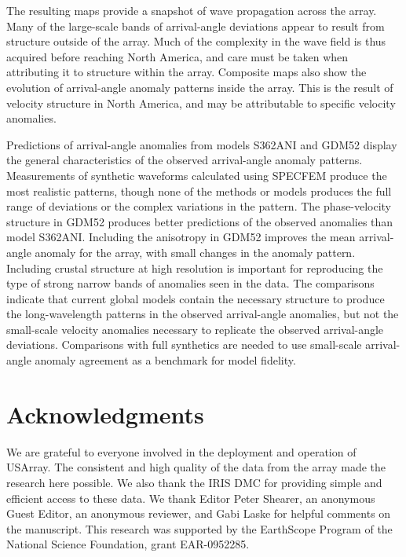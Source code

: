 \documentclass[12pt,oneside]{book}
\begin{document}
The resulting maps provide a snapshot of wave propagation across the array. Many of the large-scale bands of arrival-angle deviations appear to result from structure outside of the array. Much of the complexity in the wave field is thus acquired before reaching North America, and care must be taken when attributing it to structure within the array. Composite maps also show the evolution of arrival-angle anomaly patterns inside the array. This is the result of velocity structure in North America, and may be attributable to specific velocity anomalies. 

Predictions of arrival-angle anomalies from models S362ANI and GDM52 display the general characteristics of the observed arrival-angle anomaly patterns. Measurements of synthetic waveforms calculated using SPECFEM produce the most realistic patterns, though none of the methods or models produces the full range of deviations or the complex variations in the pattern. The phase-velocity structure in GDM52 produces better predictions of the observed anomalies than model S362ANI. Including the anisotropy in GDM52 improves the mean arrival-angle anomaly for the array, with small changes in the anomaly pattern. Including crustal structure at high resolution is important for reproducing the type of strong narrow bands of anomalies seen in the data. The comparisons indicate that current global models contain the necessary structure to produce the long-wavelength patterns in the observed arrival-angle anomalies, but not the small-scale velocity anomalies necessary to replicate the observed arrival-angle deviations. Comparisons with full synthetics are needed to use small-scale arrival-angle anomaly agreement as a benchmark for model fidelity. 

\section*{Acknowledgments}
We are grateful to everyone involved in the deployment and operation of USArray. The consistent and high quality of the data from the array made the research here possible. We also thank the IRIS DMC for providing simple and efficient access to these data. We thank Editor Peter Shearer, an anonymous Guest Editor, an anonymous reviewer, and Gabi Laske for helpful comments on the manuscript. This research was supported by the EarthScope Program of the National Science Foundation, grant EAR-0952285.  
\end{document}
